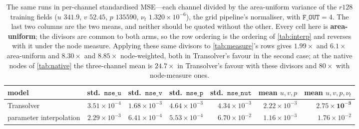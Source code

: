\begin{table}[t]
\centering
\small
\caption{The same runs in per-channel standardised MSE---each channel divided by the
area-uniform variance of the $r128$ training fields ($u$ $341.9$, $v$ $52.45$, $p$
$135590$, $\nu_t$ $1.320{\times}10^{-6}$), the grid pipeline's normaliser, with
$\texttt{F\_OUT}=4$. The last two columns are the two means, and neither should be
quoted without the other. Every cell here is \textbf{area-uniform}; the divisors are
common to both arms, so the row ordering is the ordering of \autoref{tab:interp} and
reverses with it under the node measure. Applying these same divisors to
\autoref{tab:measure}'s rows gives $1.99\times$ and $6.1\times$ area-uniform and
$8.30\times$ and $8.85\times$ node-weighted, both in Transolver's favour in the second
case; at the native nodes of \autoref{tab:native} the three-channel mean is $24.7\times$
in Transolver's favour with these divisors and $80\times$ with node-measure ones.}
\label{tab:interp_std}
\begin{adjustbox}{max width=\textwidth}
\begin{tabular}{l r r r r r r}
\toprule
model & std.\ $\texttt{mse\_u}$ & std.\ $\texttt{mse\_v}$ & std.\ $\texttt{mse\_p}$ & std.\ $\texttt{mse\_nut}$ & mean $u,v,p$ & mean $u,v,p,\nu_t$ \\
\midrule
Transolver & $3.51{\times}10^{-4}$ & $1.68{\times}10^{-3}$ & $4.64{\times}10^{-3}$ & $4.34{\times}10^{-3}$ & $2.22{\times}10^{-3}$ & $\mathbf{2.75{\times}10^{-3}}$ \\
parameter interpolation & $2.29{\times}10^{-3}$ & $6.41{\times}10^{-4}$ & $5.53{\times}10^{-4}$ & $6.70{\times}10^{-2}$ & $1.16{\times}10^{-3}$ & $1.76{\times}10^{-2}$ \\
\bottomrule
\end{tabular}
\end{adjustbox}
\end{table}

